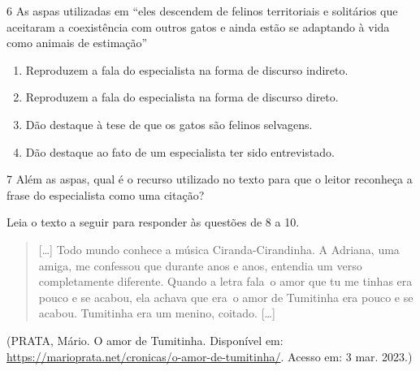 \num{6} As aspas utilizadas em ``eles descendem de felinos territoriais
e solitários que aceitaram a coexistência com outros gatos e ainda estão
se adaptando à vida como animais de estimação''

\begin{enumerate}
\def\labelenumi{\alph{enumi})}
\item Reproduzem a fala do especialista na forma de discurso indireto.
\item Reproduzem a fala do especialista na forma de discurso direto.
\item Dão destaque à tese de que os gatos são felinos selvagens.
\item Dão destaque ao fato de um especialista ter sido entrevistado.
\end{enumerate}


\num{7} Além as aspas, qual é o recurso utilizado no texto para que o
leitor reconheça a frase do especialista como uma citação?



Leia o texto a seguir para responder às questões de 8 a 10.

\begin{quote}
{[}\ldots{]} Todo mundo conhece a música Ciranda-Cirandinha. A Adriana,
uma amiga, me confessou que durante anos e anos, entendia um verso
completamente diferente. Quando a letra fala~o amor que tu me tinhas era
pouco e se acabou, ela achava que era~o amor de Tumitinha era pouco e se
acabou. Tumitinha era um menino, coitado. {[}\ldots{]}
\end{quote}

(PRATA, Mário. O amor de Tumitinha. Disponível em: 
\url{https://marioprata.net/cronicas/o-amor-de-tumitinha/}.
Acesso em: 3 mar. 2023.)

